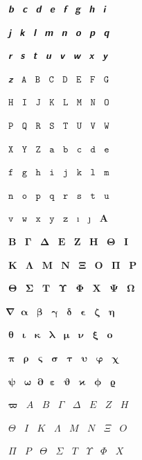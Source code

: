 \documentclass{article}
\begin{document}
$\mbfitsansb$ $\mbfitsansc$ $\mbfitsansd$ $\mbfitsanse$ $\mbfitsansf$ $\mbfitsansg$ $\mbfitsansh$ $\mbfitsansi$ \par
$\mbfitsansj$ $\mbfitsansk$ $\mbfitsansl$ $\mbfitsansm$ $\mbfitsansn$ $\mbfitsanso$ $\mbfitsansp$ $\mbfitsansq$ \par
$\mbfitsansr$ $\mbfitsanss$ $\mbfitsanst$ $\mbfitsansu$ $\mbfitsansv$ $\mbfitsansw$ $\mbfitsansx$ $\mbfitsansy$ \par
$\mbfitsansz$ $\mttA$ $\mttB$ $\mttC$ $\mttD$ $\mttE$ $\mttF$ $\mttG$ \par
$\mttH$ $\mttI$ $\mttJ$ $\mttK$ $\mttL$ $\mttM$ $\mttN$ $\mttO$ \par
$\mttP$ $\mttQ$ $\mttR$ $\mttS$ $\mttT$ $\mttU$ $\mttV$ $\mttW$ \par
$\mttX$ $\mttY$ $\mttZ$ $\mtta$ $\mttb$ $\mttc$ $\mttd$ $\mtte$ \par
$\mttf$ $\mttg$ $\mtth$ $\mtti$ $\mttj$ $\mttk$ $\mttl$ $\mttm$ \par
$\mttn$ $\mtto$ $\mttp$ $\mttq$ $\mttr$ $\mtts$ $\mttt$ $\mttu$ \par
$\mttv$ $\mttw$ $\mttx$ $\mtty$ $\mttz$ $\imath$ $\jmath$ $\mbfAlpha$ \par
$\mbfBeta$ $\mbfGamma$ $\mbfDelta$ $\mbfEpsilon$ $\mbfZeta$ $\mbfEta$ $\mbfTheta$ $\mbfIota$ \par
$\mbfKappa$ $\mbfLambda$ $\mbfMu$ $\mbfNu$ $\mbfXi$ $\mbfOmicron$ $\mbfPi$ $\mbfRho$ \par
$\mbfvarTheta$ $\mbfSigma$ $\mbfTau$ $\mbfUpsilon$ $\mbfPhi$ $\mbfChi$ $\mbfPsi$ $\mbfOmega$ \par
$\mbfnabla$ $\mbfalpha$ $\mbfbeta$ $\mbfgamma$ $\mbfdelta$ $\mbfvarepsilon$ $\mbfzeta$ $\mbfeta$ \par
$\mbftheta$ $\mbfiota$ $\mbfkappa$ $\mbflambda$ $\mbfmu$ $\mbfnu$ $\mbfxi$ $\mbfomicron$ \par
$\mbfpi$ $\mbfrho$ $\mbfvarsigma$ $\mbfsigma$ $\mbftau$ $\mbfupsilon$ $\mbfvarphi$ $\mbfchi$ \par
$\mbfpsi$ $\mbfomega$ $\mbfpartial$ $\mbfepsilon$ $\mbfvartheta$ $\mbfvarkappa$ $\mbfphi$ $\mbfvarrho$ \par
$\mbfvarpi$ $\mitAlpha$ $\mitBeta$ $\mitGamma$ $\mitDelta$ $\mitEpsilon$ $\mitZeta$ $\mitEta$ \par
$\mitTheta$ $\mitIota$ $\mitKappa$ $\mitLambda$ $\mitMu$ $\mitNu$ $\mitXi$ $\mitOmicron$ \par
$\mitPi$ $\mitRho$ $\mitvarTheta$ $\mitSigma$ $\mitTau$ $\mitUpsilon$ $\mitPhi$ $\mitChi$ \par
\end{document}
